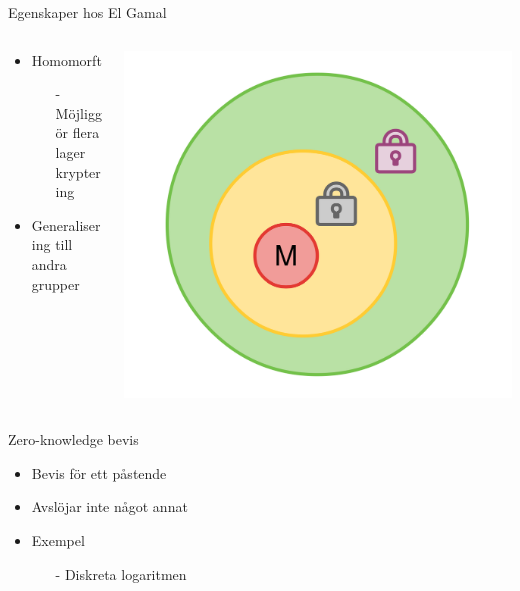 \begin{frame}{Egenskaper hos El Gamal}

\begin{columns}
	\begin{column}{0.6\textwidth}
		\begin{itemize}
			\item Homomorft
			\begin{itemize}
				\item[-] Möjliggör flera lager kryptering
			\end{itemize}
			\item Generalisering till andra grupper
		\end{itemize}
	\end{column}
	\begin{column}{0.4\textwidth}
		\includegraphics[width=\textwidth]{images/mix6.pdf}
	\end{column}
\end{columns}

\end{frame}

\begin{frame}{Zero-knowledge bevis}

\begin{itemize}
\item Bevis för ett påstende
\item Avslöjar inte något annat
\item Exempel
\begin{itemize}
	\item[-] Diskreta logaritmen
\end{itemize}
\end{itemize}

\end{frame}

